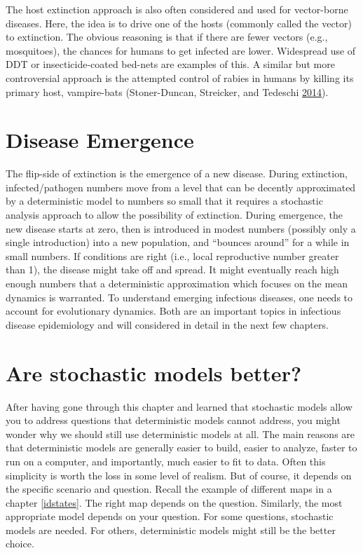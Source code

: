 \documentclass[
]{book}
\begin{document}
The host extinction approach is also often considered and used for vector-borne diseases. Here, the idea is to drive one of the hosts (commonly called the vector) to extinction. The obvious reasoning is that if there are fewer vectors (e.g., mosquitoes), the chances for humans to get infected are lower. Widespread use of DDT or insecticide-coated bed-nets are examples of this. A similar but more controversial approach is the attempted control of rabies in humans by killing its primary host, vampire-bats (Stoner-Duncan, Streicker, and Tedeschi \protect\hyperlink{ref-stoner-duncan14}{2014}).

\hypertarget{disease-emergence}{%
\section{Disease Emergence}\label{disease-emergence}}

The flip-side of extinction is the emergence of a new disease. During extinction, infected/pathogen numbers move from a level that can be decently approximated by a deterministic model to numbers so small that it requires a stochastic analysis approach to allow the possibility of extinction. During emergence, the new disease starts at zero, then is introduced in modest numbers (possibly only a single introduction) into a new population, and ``bounces around'' for a while in small numbers. If conditions are right (i.e., local reproductive number greater than 1), the disease might take off and spread. It might eventually reach high enough numbers that a deterministic approximation which focuses on the mean dynamics is warranted. To understand emerging infectious diseases, one needs to account for evolutionary dynamics. Both are an important topics in infectious disease epidemiology and will considered in detail in the next few chapters.

\hypertarget{are-stochastic-models-better}{%
\section{Are stochastic models better?}\label{are-stochastic-models-better}}

After having gone through this chapter and learned that stochastic models allow you to address questions that deterministic models cannot address, you might wonder why we should still use deterministic models at all. The main reasons are that deterministic models are generally easier to build, easier to analyze, faster to run on a computer, and importantly, much easier to fit to data. Often this simplicity is worth the loss in some level of realism. But of course, it depends on the specific scenario and question. Recall the example of different maps in a chapter \ref{idstates}. The right map depends on the question. Similarly, the most appropriate model depends on your question. For some questions, stochastic models are needed. For others, deterministic models might still be the better choice.
\end{document}
